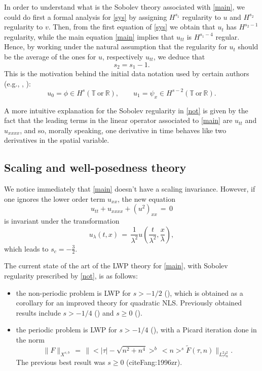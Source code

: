 \documentclass{amsart}
\begin{document}
In order to understand what is the Sobolev theory associated with \eqref{main}, we could do first a formal analysis for \eqref{sys} by assigning $H^{s_1}$ regularity to $u$ and $H^{s_2}$ regularity to $v$. Then, from the first equation of \eqref{sys} we obtain that $u_t$ has $H^{s_2-1}$ regularity, while the main equation \eqref{main} implies that $u_{tt}$ is $H^{s_1-4}$ regular. Hence, by working under the natural assumption that the regularity for $u_t$ should be the average of the ones for $u$, respectively $u_{tt}$, we deduce that
\[
s_2=s_1-1.
\] 
This is the motivation behind the initial data notation used by certain authors (e.g., \cite{Farah:2009uq}, \cite{Farah:2010ys}):
\begin{equation}
u_0=\phi\in H^s(\mathbb{T}\ \text{or} \ \mathbb{R}), \qquad u_1=\psi_x \in H^{s-2}(\mathbb{T}\ \text{or} \ \mathbb{R}).
\label{not}
\end{equation}

A more intuitive explanation for the Sobolev regularity in \eqref{not} is given by the fact that the leading terms in the linear operator associated to \eqref{main} are $u_{tt}$ and $u_{xxxx}$, and so, morally speaking, one derivative in time behaves like two derivatives in the spatial variable. 

\subsection{Scaling and well-posedness theory} We notice immediately that \eqref{main} doesn't have a scaling invariance. However, if one ignores the lower order term $u_{xx}$, the new equation 
\begin{equation}
u_{tt}+u_{xxxx}+(u^2)_{xx}\,=\,0\label{new}
\end{equation}
is invariant under the transformation
\[
u_{\lambda}(t,x)\,=\,\frac{1}{\lambda^2}u\left(\frac{t}{\lambda^2}, \frac{x}{\lambda}\right),
\]
which leads to $s_c=-\frac 32$.

The current state of the art of the LWP theory for \eqref{main}, with Sobolev regularity prescribed by \eqref{not}, is as follows:
\begin{itemize}
\item the non-periodic problem is LWP for $s>-1/2$ (\cite{Kishimoto:2010ly}), which is obtained as a corollary for an improved theory for quadratic NLS. Previously obtained results include $s>-1/4$ (\cite{Farah:2009uq}) and $s\geq 0$ (\cite{Linares:1993ly}).

\item the periodic problem is LWP for $s>-1/4$ (\cite{Farah:2010ys}), with a Picard iteration done in
the norm
\[
\|F\|_{X^{s,b}}\,=\,\|<|\tau|-\sqrt{n^2+n^4}>^b\,<n>^s \tilde{F}(\tau,n)\|_{L^2_{\tau}l^2_n}.
\]
The previous best result was $s\geq 0$ (cite{Fang:1996zr}).
\end{itemize}
\end{document}
